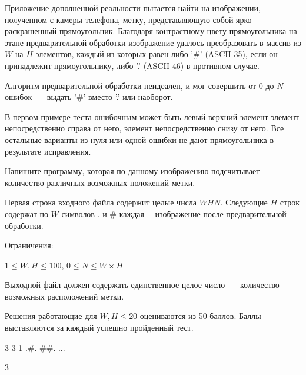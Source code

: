 
Приложение дополненной реальности пытается найти на изображении, полученном с камеры телефона, метку, представляющую собой ярко раскрашенный прямоугольник. Благодаря контрастному цвету прямоугольника на этапе предварительной обработки изображение удалось преобразовать в массив из $W$ на $H$ элементов, каждый из которых равен либо '\#' (ASCII 35), если он принадлежит прямоугольнику, либо '.' (ASCII 46) в противном случае.

Алгоритм предварительной обработки неидеален, и мог совершить от $0$ до $N$ ошибок~--- выдать '\#' вместо '.' или наоборот.

В первом примере теста ошибочным может быть левый верхний элемент элемент непосредственно справа от него, элемент непосредственно снизу от него. Все остальные варианты из нуля или одной ошибки не дают прямоугольника в результате исправления.

Напишите программу, которая по данному изображению подсчитывает количество различных возможных положений метки.


Первая строка входного файла содержит целые числа $W H N$. Следующие $H$ строк содержат по $W$ символов . и \# каждая~--
изображение после предварительной обработки.

Ограничения:

$1 \le W, H \le 100$, $0 \le N \le W \times H$

\outputfmtSection

Выходной файл должен содержать единственное целое число~--- количество возможных расположений метки.

\markSection

Решения работающие для $W, H \le 20$ оцениваются из 50 баллов. Баллы выставляются за каждый успешно пройденный тест.


\begin{myverbbox}[\small]{\vinput}
    3 3 1
    .#.
    ##.
    ...
\end{myverbbox}
\begin{myverbbox}[\small]{\voutput}
    3
\end{myverbbox}

